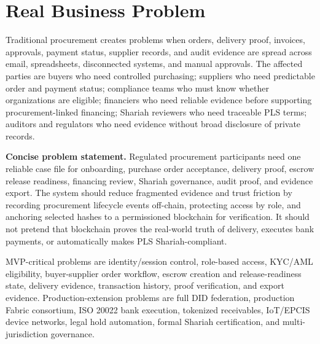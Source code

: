 \documentclass[conference]{IEEEtran}
\begin{document}
\section{Real Business Problem}
Traditional procurement creates problems when orders, delivery proof, invoices, approvals, payment status, supplier records, and audit evidence are spread across email, spreadsheets, disconnected systems, and manual approvals. The affected parties are buyers who need controlled purchasing; suppliers who need predictable order and payment status; compliance teams who must know whether organizations are eligible; financiers who need reliable evidence before supporting procurement-linked financing; Shariah reviewers who need traceable PLS terms; auditors and regulators who need evidence without broad disclosure of private records.

\textbf{Concise problem statement.} Regulated procurement participants need one reliable case file for onboarding, purchase order acceptance, delivery proof, escrow release readiness, financing review, Shariah governance, audit proof, and evidence export. The system should reduce fragmented evidence and trust friction by recording procurement lifecycle events off-chain, protecting access by role, and anchoring selected hashes to a permissioned blockchain for verification. It should not pretend that blockchain proves the real-world truth of delivery, executes bank payments, or automatically makes PLS Shariah-compliant.

MVP-critical problems are identity/session control, role-based access, KYC/AML eligibility, buyer-supplier order workflow, escrow creation and release-readiness state, delivery evidence, transaction history, proof verification, and export evidence. Production-extension problems are full DID federation, production Fabric consortium, ISO 20022 bank execution, tokenized receivables, IoT/EPCIS device networks, legal hold automation, formal Shariah certification, and multi-jurisdiction governance.
\end{document}

